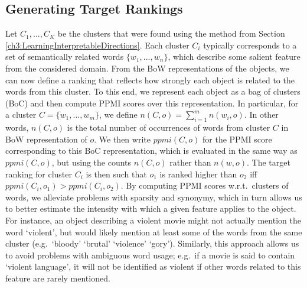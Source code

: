 \subsection{Generating Target Rankings}\label{secTargetRankings} \raggedbottom 
Let $C_1,...,C_K$ be the clusters that were found using the method from Section \ref{ch3:LearningInterpretableDirections}. 
Each cluster $C_i$ typically corresponds to a set of semantically related words $\{w_1,...,w_n\}$, which describe some salient feature from the considered domain. 
From the BoW representations of the objects, we can now define a ranking that reflects how strongly each object is related to the words from this cluster. To this end, we represent each object as a bag of clusters (BoC) and then compute PPMI scores over this representation. In particular, for a cluster $C = \{w_1,...,w_m\}$, we define $n(C,o)=\sum_{i=1}^m n(w_i,o)$. In other words, $n(C,o)$ is the total number of occurrences of words from cluster $C$ in BoW representation of $o$. We then write $\textit{ppmi}(C,o)$ for the PPMI score corresponding to this BoC representation, which is evaluated in the same way as $\textit{ppmi}(C,o)$, but using the counts $n(C,o)$ rather than $n(w,o)$. The target ranking for cluster $C_i$ is then such that $o_1$ is ranked higher than $o_2$ iff $\textit{ppmi}(C_i,o_1) > \textit{ppmi}(C_i,o_2)$. By computing PPMI scores w.r.t.\ clusters of words, we alleviate problems with sparsity and synonymy, which in turn allows us to better estimate the intensity with which a given feature applies to the object. For instance, an object describing a violent movie might not actually mention the word `violent', but would likely mention at least some of the words from the same cluster (e.g.\ `bloody' `brutal' `violence' `gory'). Similarly, this approach allows us to avoid problems with ambiguous word usage; e.g.\ if a movie is said to contain `violent language', it will not be identified as violent if other words related to this feature are rarely mentioned.



